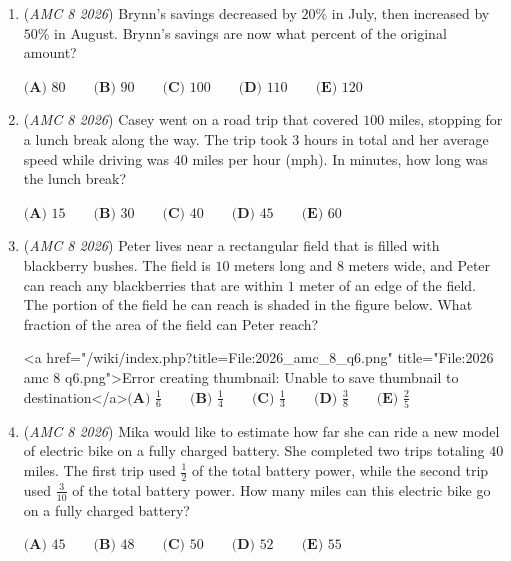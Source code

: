 \begin{enumerate}
 $\textbf{(A) }\text{Triangle only} \qquad \textbf{(B) }\text{Hexagon and square only} \\  \textbf{(C) }\text{Hexagon and triangle only} \qquad \textbf{(D) }\text{Square and triangle only} \\ \textbf{(E) }\text{Hexagon, triangle, and square}$


	\item (\textit{AMC 8 2026}) Brynn's savings decreased by $20$\% in July, then increased by $50$\% in August. Brynn's savings are
now what percent of the original amount?


 $\textbf{(A) }80 \qquad \textbf{(B) }90 \qquad \textbf{(C) }100 \qquad \textbf{(D) }110 \qquad \textbf{(E) }120$


	\item (\textit{AMC 8 2026}) Casey went on a road trip that covered $100$ miles, stopping for a lunch break along the way. The trip took $3$ hours in total and her average speed while driving was $40$ miles per hour (mph). In minutes, how long was the lunch break?


 $\textbf{(A) }15 \qquad \textbf{(B) }30 \qquad \textbf{(C) }40 \qquad \textbf{(D) }45 \qquad \textbf{(E) }60$


	\item (\textit{AMC 8 2026}) Peter lives near a rectangular field that is filled with blackberry bushes. The field is $10$ meters long and $8$ meters wide, and Peter can reach any blackberries that are within $1$ meter of an edge of the field. The portion of the field he can reach is shaded in the figure below. What fraction of the area of the field can Peter reach?


 <a href="/wiki/index.php?title=File:2026\_amc\_8\_q6.png" title="File:2026 amc 8 q6.png">Error creating thumbnail: Unable to save thumbnail to destination</a>$\textbf{(A) } \frac{1}{6}\qquad\textbf{(B) } \frac{1}{4}\qquad\textbf{(C) } \frac{1}{3}\qquad\textbf{(D) } \frac{3}{8}\qquad\textbf{(E) } \frac{2}{5}\qquad$


	\item (\textit{AMC 8 2026}) Mika would like to estimate how far she can ride a new model of electric bike on a fully charged battery. She completed two trips totaling $40$ miles. The first trip used $\frac{1}{2}$ of the total battery power, while the second trip used $\frac{3}{10}$ of the total battery power. How many miles can this electric bike go on a fully charged battery?


 $\textbf{(A) } 45\qquad\textbf{(B) } 48\qquad\textbf{(C) } 50\qquad\textbf{(D) } 52\qquad\textbf{(E) } 55\qquad$



\end{enumerate}
